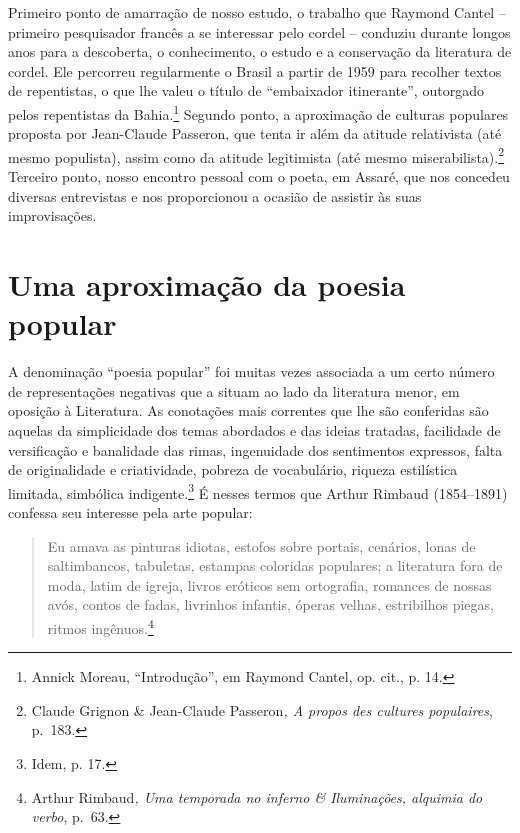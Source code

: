 Primeiro ponto de amarração de nosso estudo, o trabalho que Raymond Cantel --
primeiro pesquisador francês a se interessar pelo cordel -- conduziu durante
longos anos para a descoberta, o conhecimento, o estudo e a conservação da
literatura de cordel. Ele percorreu regularmente o Brasil a partir de 1959 para
recolher textos de repentistas, o que lhe valeu o título de “embaixador
itinerante”, outorgado pelos repentistas da Bahia.\footnote{ Annick Moreau,
“Introdução”, em Raymond Cantel, op. cit., p. 14.} Segundo ponto, a
aproximação de culturas populares proposta por Jean-Claude Passeron, que tenta
ir além da atitude relativista (até mesmo populista), assim como da atitude
legitimista (até mesmo miserabilista).\footnote{ Claude Grignon \& Jean-Claude
Passeron\textit{, A propos des cultures populaires}, p.~183.} Terceiro ponto,
nosso encontro pessoal com o poeta, em Assaré, que nos concedeu diversas
entrevistas e nos proporcionou a ocasião de assistir às suas improvisações.

\section{Uma aproximação da poesia popular}

A denominação “poesia popular” foi muitas vezes associada a um certo número de
representações negativas que a situam ao lado da literatura menor, em oposição à
Literatura. As conotações mais correntes que lhe são conferidas são aquelas da
simplicidade dos temas abordados e das ideias tratadas, facilidade de
versificação e banalidade das rimas, ingenuidade dos sentimentos expressos,
falta de originalidade e criatividade, pobreza de vocabulário, riqueza
estilística limitada, simbólica indigente.\footnote{Idem, p. 17.} É
nesses termos que Arthur Rimbaud (1854--1891) confessa seu interesse pela arte
popular:

\begin{quote}
Eu amava as pinturas idiotas, estofos sobre portais, cenários, lonas
de saltimbancos, tabuletas, estampas coloridas populares; a literatura fora de
moda, latim de igreja, livros eróticos sem ortografia, romances de nossas avós,
contos de fadas, livrinhos infantis, óperas velhas, estribilhos piegas, ritmos
ingênuos.\footnote{ Arthur Rimbaud\textit{, Uma temporada no inferno \&
Iluminações, alquimia do verbo}, p.~63.}
\end{quote}


